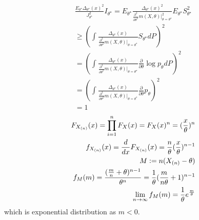 \documentclass[hidequestions]{homework}
\begin{document}
\begin{align*}
    \frac{E_{\theta^\star}\Delta_{\theta^\star}(x)^2}{J_{\theta^\star}^2} I_{\theta^\star} =
    E_{\theta^\star}  \frac{\Delta_{\theta^\star}(x)^2}{\frac{\partial^2}{\partial\theta^2}m(X,\theta)\Bigr|_{\theta = \theta^\star}^2} E_{\theta^\star} S_{\theta^\star}^2 \\
    \geq (\int \frac{\Delta_{\theta^\star}(x)}{\frac{\partial^2}{\partial\theta^2}m(X,\theta)\Bigr|_{\theta = \theta^\star}}S_{\theta^\star} dP)^2\\
    =(\int \frac{\Delta_{\theta^\star}(x)}{\frac{\partial^2}{\partial\theta^2}m(X,\theta)\Bigr|_{\theta = \theta^\star}} \frac{\partial}{\partial \theta}\log p_\theta dP)^2\\
    =(\int \frac{\Delta_{\theta^\star}(x)}{\frac{\partial^2}{\partial\theta^2}m(X,\theta)\Bigr|_{\theta = \theta^\star}} \frac{\partial}{\partial \theta} p_\theta )^2\\
    =1
\end{align*}
\problem 
\begin{align*}
    F_{X_{(n)}}(x) = \prod_{i=1}^{n}F_X(x) = F_X(x)^n = (\frac{x}{\theta})^n\\
    f_{X_{(n)}}(x) = \frac{d}{dx}F_{X_{(n)}}(x) = \frac{n}{\theta}(\frac{x}{\theta})^{n-1}\\
    M \vcentcolon= n(X_{(n)}-\theta)\\
    f_M(m) = \frac{(\frac{m}{n}+\theta)^{n-1}}{\theta^n} = \frac{1}{\theta}(\frac{m}{n\theta}+1)^{n-1}\\
    \lim_{n\rightarrow\infty}f_M(m) = \frac{1}{\theta}e^{\frac{m}{\theta}}
\end{align*}
which is exponential distribution as $m < 0$.
\end{document}
